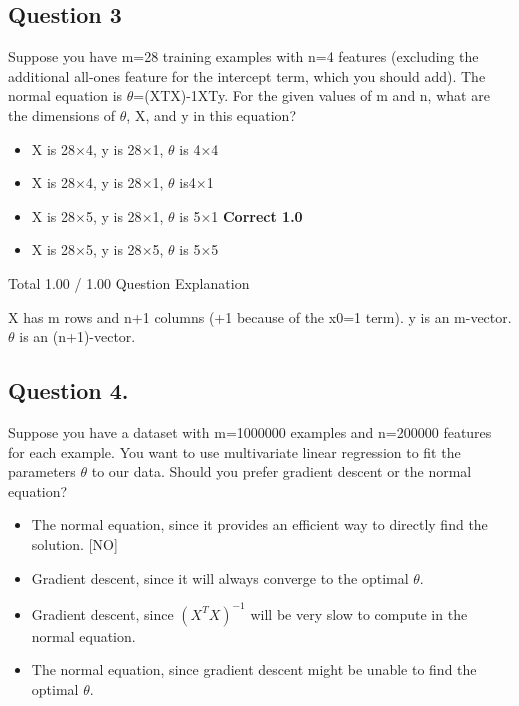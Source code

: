 \documentclass[11pt]{article} %
\begin{document}
	\subsection*{Question 3}
	Suppose you have m=28 training examples with n=4 features (excluding the additional 
	all-ones feature for the intercept term, which you should add). The normal equation is $\theta$=(XTX)-1XTy. 
	For the given values of m and n, what are the dimensions of $\theta$, X, and y in this equation?
	
	\begin{itemize}
		\item X is 28$\times$4, y is 28$\times$1, $\theta$ is 4$\times$4			
		\item X is 28$\times$4, y is 28$\times$1, $\theta$ is4$\times$1			
		\item X is 28$\times$5, y is 28$\times$1, $\theta$ is 5$\times$1	\textbf{Correct	1.0}	
		\item X is 28$\times$5, y is 28$\times$5, $\theta$ is 5$\times$5
	\end{itemize}			
	Total		1.00 / 1.00	
	Question Explanation
	
	X has m rows and n+1 columns (+1 because of the x0=1 term). y is an m-vector. $\theta$ is an (n+1)-vector.
	\subsection{Question 4.} 
	Suppose you have a dataset with m=1000000 examples and n=200000 features for each example. You want to use multivariate linear regression to fit the parameters $\theta$ to our data. Should you prefer gradient descent or the normal equation?
	
	
	\begin{itemize}
		\item The normal equation, since it provides an efficient way to directly find the solution. [NO]
		
		\item Gradient descent, since it will always converge to the optimal $\theta$.
		
		\item Gradient descent, since $(X^TX)^{-1}$ will be very slow to compute in the normal equation.
		
		\item The normal equation, since gradient descent might be unable to find the optimal $\theta$.
	\end{itemize}
	
\end{document}
